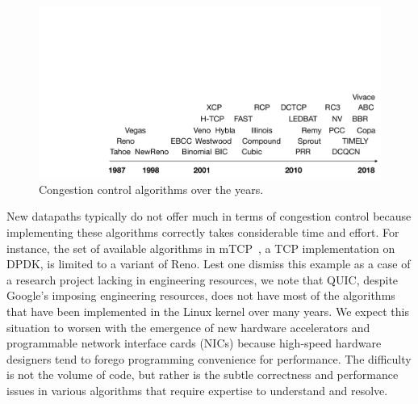 \begin{figure}[t]
\centering
    \includegraphics[width=\columnwidth]{img/cc-timeline-nocongsig}
    \vspace{-20pt}
    \caption{Congestion control algorithms over the years.}\label{fig:cctimeline}
    \vspace{-17pt}
\end{figure}

New datapaths typically do not offer much in terms of congestion control because implementing these algorithms correctly takes considerable time and effort. For instance, the set of available algorithms in mTCP~\cite{mtcp}, a TCP implementation on DPDK, is limited to a variant of Reno. 
Lest one dismiss this example as a case of a research project lacking in engineering resources, we note that QUIC, despite Google's imposing engineering resources, does not have most of the algorithms that have been implemented in the Linux kernel over many years.  
We expect this situation to worsen with the emergence of new hardware accelerators and programmable network interface cards (NICs) because high-speed hardware designers tend to forego programming convenience for performance. 
The difficulty is not the volume of code, but rather is the subtle correctness and performance issues in various algorithms that require expertise to understand and resolve.

